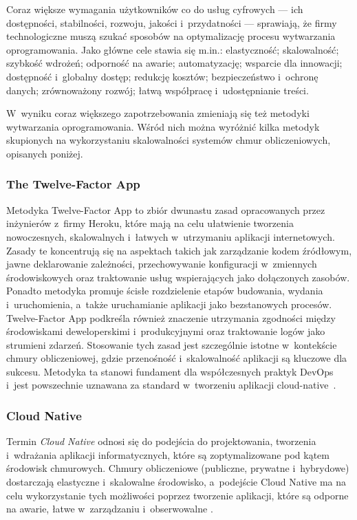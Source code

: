 Coraz większe wymagania użytkowników co do usług cyfrowych --- ich dostępności, stabilności, rozwoju, jakości i~przydatności --- sprawiają, że firmy technologiczne muszą szukać sposobów na optymalizację procesu wytwarzania oprogramowania.
Jako główne cele stawia się m.in.: elastyczność; skalowalność; szybkość wdrożeń; odporność na awarie; automatyzację; wsparcie dla innowacji; dostępność i~globalny dostęp; redukcję kosztów; bezpieczeństwo i~ochronę danych; zrównoważony rozwój; łatwą współpracę i~udostępnianie treści.

W~wyniku coraz większego zapotrzebowania zmieniają się też metodyki wytwarzania oprogramowania. Wśród nich można wyróżnić kilka metodyk skupionych na wykorzystaniu skalowalności systemów chmur obliczeniowych, opisanych poniżej.

\subsubsection{The Twelve-Factor App}
Metodyka Twelve-Factor App to zbiór dwunastu zasad opracowanych przez inżynierów z~firmy Heroku, które mają na celu ułatwienie tworzenia nowoczesnych, skalowalnych i~łatwych w~utrzymaniu aplikacji internetowych. Zasady te koncentrują się na aspektach takich jak zarządzanie kodem źródłowym, jawne deklarowanie zależności, przechowywanie konfiguracji w~zmiennych środowiskowych oraz traktowanie usług wspierających jako dołączonych zasobów. Ponadto metodyka promuje ścisłe rozdzielenie etapów budowania, wydania i~uruchomienia, a~także uruchamianie aplikacji jako bezstanowych procesów. Twelve-Factor App podkreśla również znaczenie utrzymania zgodności między środowiskami deweloperskimi i~produkcyjnymi oraz traktowanie logów jako strumieni zdarzeń. Stosowanie tych zasad jest szczególnie istotne w~kontekście chmury obliczeniowej, gdzie przenośność i~skalowalność aplikacji są kluczowe dla sukcesu. Metodyka ta stanowi fundament dla współczesnych praktyk DevOps i~jest powszechnie uznawana za standard w~tworzeniu aplikacji cloud-native~\cite{Wiggins2012TwelveFactor}.

\subsubsection{Cloud Native}
Termin \textit{Cloud Native} odnosi się do podejścia do projektowania, tworzenia i~wdrażania aplikacji informatycznych, które są zoptymalizowane pod kątem środowisk chmurowych. Chmury obliczeniowe (publiczne, prywatne i~hybrydowe) dostarczają elastyczne i~skalowalne środowisko, a~podejście Cloud Native ma na celu wykorzystanie tych możliwości poprzez tworzenie aplikacji, które są odporne na awarie, łatwe w~zarządzaniu i~obserwowalne \cite{CNCFCloudNativeDefinition,GoogleCloudNativeDefinition,MicrosoftCloudNativeDefinition}.

